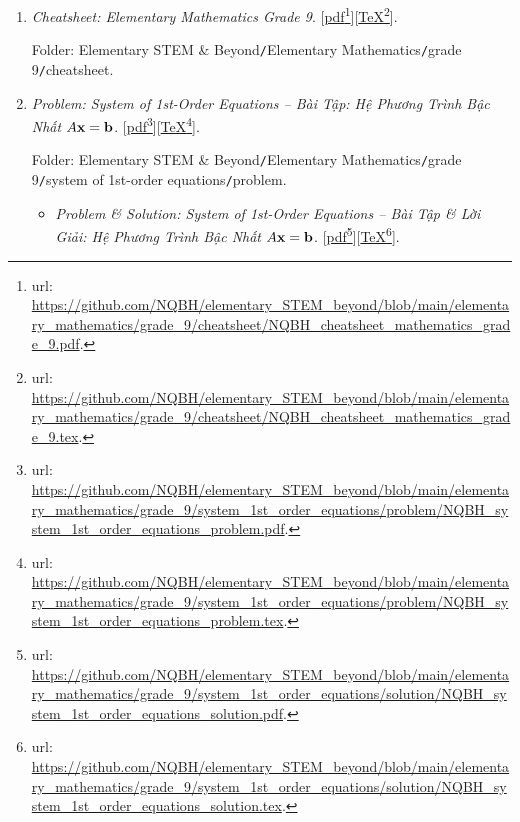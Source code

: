 \documentclass[12pt,oneside]{book}
\begin{document}
\begin{enumerate}
	\item {\it Cheatsheet: Elementary Mathematics Grade 9}. [\href{https://github.com/NQBH/elementary_STEM_beyond/blob/main/elementary_mathematics/grade_9/cheatsheet/NQBH_cheatsheet_mathematics_grade_9.pdf}{pdf}\footnote{{\sc url}: \url{https://github.com/NQBH/elementary_STEM_beyond/blob/main/elementary_mathematics/grade_9/cheatsheet/NQBH_cheatsheet_mathematics_grade_9.pdf}.}][\href{https://github.com/NQBH/elementary_STEM_beyond/blob/main/elementary_mathematics/grade_9/cheatsheet/NQBH_cheatsheet_mathematics_grade_9.tex}{\TeX}\footnote{{\sc url}: \url{https://github.com/NQBH/elementary_STEM_beyond/blob/main/elementary_mathematics/grade_9/cheatsheet/NQBH_cheatsheet_mathematics_grade_9.tex}.}].
	
	Folder: {\sf Elementary STEM \& Beyond{\tt/}Elementary Mathematics{\tt/}grade 9{\tt/}cheatsheet}.
	\item {\it Problem: System of 1st-Order Equations -- Bài Tập: Hệ Phương Trình Bậc Nhất $A{\bf x} = {\bf b}$}. [\href{https://github.com/NQBH/elementary_STEM_beyond/blob/main/elementary_mathematics/grade_9/system_1st_order_equations/problem/NQBH_system_1st_order_equations_problem.pdf}{pdf}\footnote{{\sc url}: \url{https://github.com/NQBH/elementary_STEM_beyond/blob/main/elementary_mathematics/grade_9/system_1st_order_equations/problem/NQBH_system_1st_order_equations_problem.pdf}.}][\href{https://github.com/NQBH/elementary_STEM_beyond/blob/main/elementary_mathematics/grade_9/system_1st_order_equations/problem/NQBH_system_1st_order_equations_problem.tex}{\TeX}\footnote{{\sc url}: \url{https://github.com/NQBH/elementary_STEM_beyond/blob/main/elementary_mathematics/grade_9/system_1st_order_equations/problem/NQBH_system_1st_order_equations_problem.tex}.}].
	
	Folder: {\sf Elementary STEM \& Beyond{\tt/}Elementary Mathematics{\tt/}grade 9{\tt/}system of 1st-order equations{\tt/}problem}.
	\begin{itemize}
		\item {\it Problem \& Solution: System of 1st-Order Equations -- Bài Tập \& Lời Giải: Hệ Phương Trình Bậc Nhất $A{\bf x} = {\bf b}$}. [\href{https://github.com/NQBH/elementary_STEM_beyond/blob/main/elementary_mathematics/grade_9/system_1st_order_equations/solution/NQBH_system_1st_order_equations_solution.pdf}{pdf}\footnote{{\sc url}: \url{https://github.com/NQBH/elementary_STEM_beyond/blob/main/elementary_mathematics/grade_9/system_1st_order_equations/solution/NQBH_system_1st_order_equations_solution.pdf}.}][\href{https://github.com/NQBH/elementary_STEM_beyond/blob/main/elementary_mathematics/grade_9/system_1st_order_equations/solution/NQBH_system_1st_order_equations_solution.tex}{\TeX}\footnote{{\sc url}: \url{https://github.com/NQBH/elementary_STEM_beyond/blob/main/elementary_mathematics/grade_9/system_1st_order_equations/solution/NQBH_system_1st_order_equations_solution.tex}.}].
		

\end{itemize}
\end{enumerate}
\end{document}
